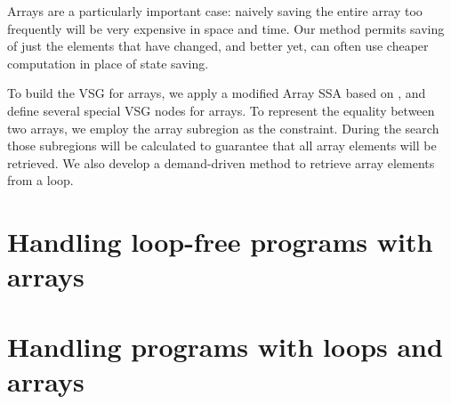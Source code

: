 \documentclass[12pt]{gatech-thesis}
\begin{document}
Arrays are a particularly important case: naively saving the entire array too frequently will be very expensive in space and time. Our method permits saving of just the elements that have changed, and better yet, can often use cheaper computation in place of state saving.

To build the VSG for arrays, we apply a modified Array SSA based on \cite{}, and define several special VSG nodes for arrays. 
To represent the equality between two arrays, we employ the array subregion as the constraint. 
During the search those subregions will be calculated to guarantee that all array elements will be retrieved. We also develop a demand-driven method to retrieve array elements from a loop. 

\section{Handling loop-free programs with arrays}
\label{sec:array-loop-free}


\section{Handling programs with loops and arrays}
\label{sec:array-loops}

\end{document}
